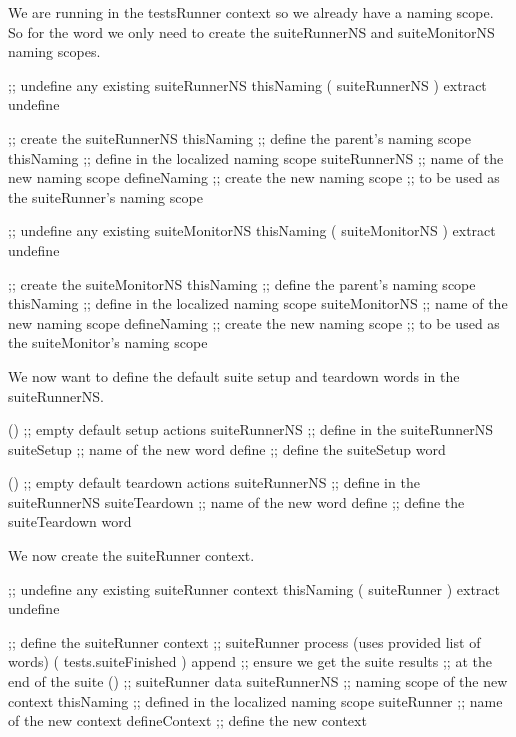 We are running in the testsRunner context so we already have a 
 naming scope. So for the  word we 
only need to create the suiteRunnerNS and suiteMonitorNS naming scopes. 

\startJoylolCode
  ;; undefine any existing suiteRunnerNS
  thisNaming
  ( suiteRunnerNS ) extract
  undefine

  ;; create the suiteRunnerNS
  thisNaming    ;; define the parent's naming scope
  thisNaming    ;; define in the localized naming scope
  suiteRunnerNS ;; name of the new naming scope
  defineNaming  ;; create the new naming scope
                ;; to be used as the suiteRunner's naming scope
\stopJoylolCode

\startJoylolCode
  ;; undefine any existing suiteMonitorNS
  thisNaming
  ( suiteMonitorNS ) extract
  undefine

  ;; create the suiteMonitorNS
  thisNaming      ;; define the parent's naming scope
  thisNaming      ;; define in the localized naming scope
  suiteMonitorNS  ;; name of the new naming scope
  defineNaming    ;; create the new naming scope
                  ;; to be used as the suiteMonitor's naming scope
\stopJoylolCode

We now want to define the default suite setup and teardown words in the 
suiteRunnerNS. 

\startJoylolCode
  ()            ;; empty default setup actions
  suiteRunnerNS ;; define in the suiteRunnerNS
  suiteSetup    ;; name of the new word
  define        ;; define the suiteSetup word
\stopJoylolCode

\startJoylolCode
  ()            ;; empty default teardown actions
  suiteRunnerNS ;; define in the suiteRunnerNS
  suiteTeardown ;; name of the new word
  define        ;; define the suiteTeardown word
\stopJoylolCode

We now create the suiteRunner context.

\startJoylolCode
  ;; undefine any existing suiteRunner context
  thisNaming
  ( suiteRunner ) extract
  undefine

  ;; define the suiteRunner context
                ;; suiteRunner process (uses provided list of words)
  ( tests.suiteFinished )
  append        ;; ensure we get the suite results
                ;; at the end of the suite
  ()            ;; suiteRunner data
  suiteRunnerNS ;; naming scope of the new context
  thisNaming    ;; defined in the localized naming scope
  suiteRunner   ;; name of the new context
  defineContext ;; define the new context
\stopJoylolCode

